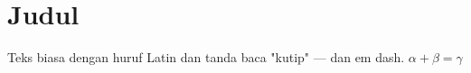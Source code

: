 \documentclass[11pt,a4paper]{report}
\begin{document}
\chapter{Judul}
Teks biasa dengan huruf Latin dan tanda baca "kutip" — dan em dash.
$\alpha + \beta = \gamma$
\end{document}
